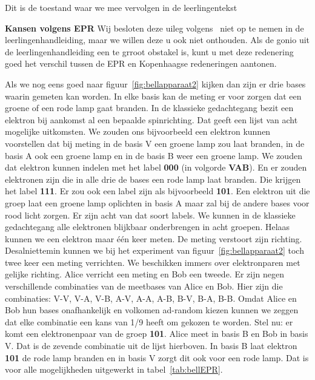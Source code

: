 \documentclass[../../main.tex]{subfiles}
\begin{document}
Dit is de toestand waar we mee vervolgen in de leerlingentekst



\textbf{Kansen volgens EPR}
Wij besloten deze uileg volgens~\cite{bernhardt2019quantum} niet op te nemen in de leerlingenhandleiding, maar we willen deze u ook niet onthouden. Als de gonio uit de leerlingenhandleiding een te grroot obstakel is, kunt u met deze redenering goed het verschil tussen de EPR en Kopenhaagse redeneringen aantonen.

Als we nog eens goed naar figuur~\ref{fig:bellapparaat2} kijken dan zijn er drie bases waarin gemeten kan worden. In elke basis kan de meting er voor zorgen dat een groene of een rode lamp gaat branden. In de klassieke gedachtegang bezit een elektron bij aankomst al een bepaalde spinrichting. Dat geeft een lijst van acht mogelijke uitkomsten. We zouden ons bijvoorbeeld een elektron kunnen voorstellen dat bij meting in de basis V een groene lamp zou laat branden, in de basis A ook een groene lamp en in de basis B weer een groene lamp. We zouden dat elektron kunnen indelen  met het label \textbf{000} (in volgorde \textbf{VAB}). En er zouden elektronen zijn die in alle drie de bases een rode lamp laat branden. Die krijgen het label \textbf{111}.  Er zou ook een label zijn als bijvoorbeeld \textbf{101}. Een elektron uit die groep laat een groene lamp oplichten in basis A maar zal bij de andere bases voor rood licht zorgen.  Er zijn acht van dat soort labels. We kunnen  in de klassieke gedachtegang alle elektronen blijkbaar onderbrengen in acht groepen. Helaas kunnen we een elektron maar \'e\'en keer meten. De meting verstoort zijn richting. Desalniettemin kunnen we bij het experiment van figuur~\ref{fig:bellapparaat2} toch twee keer een meting verrichten. We beschikken immers over elektronparen met gelijke richting.  Alice verricht een meting en Bob een tweede. Er zijn negen verschillende combinaties van de meetbases van Alice en Bob.
Hier zijn die combinaties: V-V, V-A, V-B,  A-V, A-A, A-B, B-V, B-A, B-B. Omdat Alice en Bob hun bases onafhankelijk en volkomen ad-random kiezen kunnen we zeggen dat elke combinatie een kans van 1/9 heeft om gekozen te worden. 
Stel nu: er komt een elektronenpaar  van de groep \textbf{101}. Alice meet in basis B en Bob in basis V. Dat is de zevende combinatie uit de lijst hierboven. In basis B laat elektron \textbf{101} de rode lamp branden en in basis V zorgt dit ook voor een rode lamp. Dat is voor alle mogelijkheden uitgewerkt in tabel~\ref{tab:bellEPR}.
\end{document}
